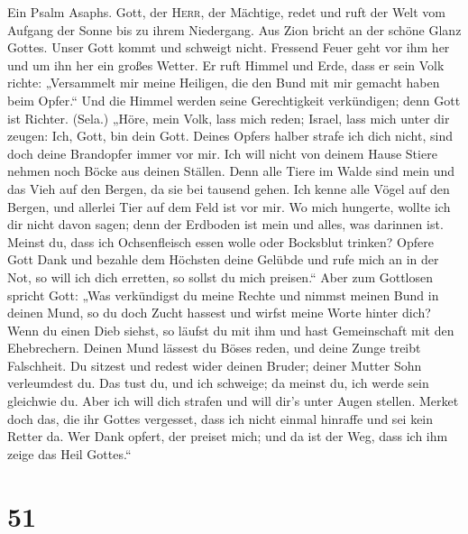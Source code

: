  Ein Psalm Asaphs. Gott, der \textsc{Herr}, der Mächtige,
redet und ruft der Welt vom Aufgang der Sonne bis zu ihrem Niedergang.
 Aus Zion bricht an der schöne Glanz Gottes.
 Unser Gott kommt und schweigt nicht. Fressend Feuer geht
vor ihm her und um ihn her ein großes Wetter.  Er ruft
Himmel und Erde, dass er sein Volk richte:  „Versammelt
mir meine Heiligen, die den Bund mit mir gemacht haben beim Opfer.``
 Und die Himmel werden seine Gerechtigkeit verkündigen;
denn Gott ist Richter. (Sela.)  „Höre, mein Volk, lass
mich reden; Israel, lass mich unter dir zeugen: Ich, Gott, bin dein
Gott.  Deines Opfers halber strafe ich dich nicht, sind
doch deine Brandopfer immer vor mir.  Ich will nicht von
deinem Hause Stiere nehmen noch Böcke aus deinen Ställen.
 Denn alle Tiere im Walde sind mein und das Vieh auf den
Bergen, da sie bei tausend gehen.  Ich kenne alle Vögel
auf den Bergen, und allerlei Tier auf dem Feld ist vor mir.
 Wo mich hungerte, wollte ich dir nicht davon sagen; denn
der Erdboden ist mein und alles, was darinnen ist. 
Meinst du, dass ich Ochsenfleisch essen wolle oder Bocksblut trinken?
 Opfere Gott Dank und bezahle dem Höchsten deine Gelübde
 und rufe mich an in der Not, so will ich dich erretten,
so sollst du mich preisen.``  Aber zum Gottlosen spricht
Gott: „Was verkündigst du meine Rechte und nimmst meinen Bund in deinen
Mund,  so du doch Zucht hassest und wirfst meine Worte
hinter dich?  Wenn du einen Dieb siehst, so läufst du mit
ihm und hast Gemeinschaft mit den Ehebrechern.  Deinen
Mund lässest du Böses reden, und deine Zunge treibt Falschheit.
 Du sitzest und redest wider deinen Bruder; deiner Mutter
Sohn verleumdest du.  Das tust du, und ich schweige; da
meinst du, ich werde sein gleichwie du. Aber ich will dich strafen und
will dir's unter Augen stellen.  Merket doch das, die ihr
Gottes vergesset, dass ich nicht einmal hinraffe und sei kein Retter da.
 Wer Dank opfert, der preiset mich; und da ist der Weg,
dass ich ihm zeige das Heil Gottes.``

\hypertarget{section-50}{%
\section{51}\label{section-50}}


